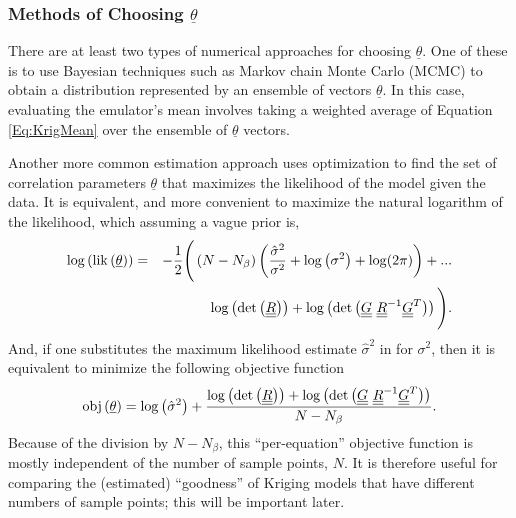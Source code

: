 \documentclass{article}
\begin{document}
\subsubsection{Methods of Choosing {$\underline{\theta}$}}
There are at least two types of numerical approaches for choosing
$\underline{\theta}$.  One of these is to use Bayesian techniques such
as Markov chain Monte Carlo (MCMC) to obtain a distribution
represented by an ensemble of vectors $\underline{\theta}$.  In this
case, evaluating the emulator's mean involves taking a weighted
average of Equation \ref{Eq:KrigMean} over the ensemble of
$\underline{\theta}$ vectors.\newline

Another more common estimation approach uses optimization to find the
set of correlation parameters $\underline{\theta}$ that maximizes the
likelihood of the model given the data.  It is equivalent, and more
convenient to maximize the natural logarithm of the likelihood, which
assuming a vague prior is,
\begin{eqnarray*}
\log\left({\rm lik}\left(\underline{\theta}\right)\right)&=&-\frac{1}{2}\Bigg(\left(N-N_{\beta}\right)\left(\frac{\hat{\sigma}^2}{\sigma^2}+\log\left(\sigma^2\right)+\log(2\pi)\right)+...\\
&& \hspace{0.4truein}\log\left(\det\left(\underline{\underline{R}}\right)\right)+\log\left(\det\left(\underline{\underline{G}}\ \underline{\underline{R}}^{-1}\underline{\underline{G}}^T\right)\right)\Bigg).
\end{eqnarray*}
And, if one substitutes the maximum likelihood estimate $\hat{\sigma}^2$ in
for $\sigma^2$, then it is equivalent to minimize the following objective 
function
\begin{displaymath}
{\rm obj}\left(\underline{\theta}\right)=\log\left(\hat{\sigma}^2\right)+\frac{\log\left(\det\left(\underline{\underline{R}}\right)\right)+\log\left(\det\left(\underline{\underline{G}}\ \underline{\underline{R}}^{-1}\underline{\underline{G}}^T\right)\right)}{N-N_{\beta}}.
\end{displaymath}
Because of the division by $N-N_{\beta}$, this ``per-equation''
objective function is mostly independent of the number of sample
points, $N$.  It is therefore useful for comparing the (estimated)
``goodness'' of Kriging models that have different numbers of sample
points; this will be important later.\newline
\end{document}
